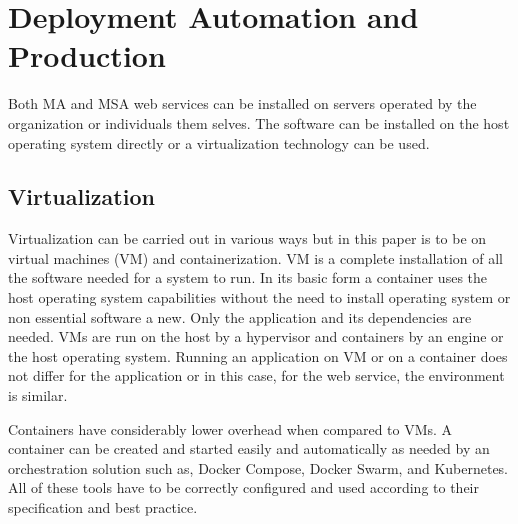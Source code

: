 

\section{Deployment Automation and Production}
\begin{sloppypar}
    Both MA and MSA web services can be installed on servers operated by the
    organization or individuals them selves. The software can be installed on
    the host operating system directly or a virtualization technology can be
    used.
\end{sloppypar}

\subsection{Virtualization}
\begin{sloppypar}
    Virtualization can be carried out in various ways but in this paper is to be
    on virtual machines (VM) and containerization. VM is a complete installation
    of all the software needed for a system to run. In its basic form a
    container uses the host operating system capabilities without the need to
    install operating system or non essential software a new. Only the
    application and its dependencies are needed. VMs are run on the host by a
    hypervisor and containers by an engine or the host operating system. Running
    an application on VM or on a container does not differ for the application
    or in this case, for the web service, the environment is similar.
\end{sloppypar}
\begin{sloppypar}
    Containers have considerably lower overhead when compared to VMs. A
    container can be created and started easily and automatically as needed by
    an orchestration solution such as, Docker Compose, Docker Swarm, and
    Kubernetes. All of these tools have to be correctly configured and used
    according to their specification and best practice.
\end{sloppypar}

